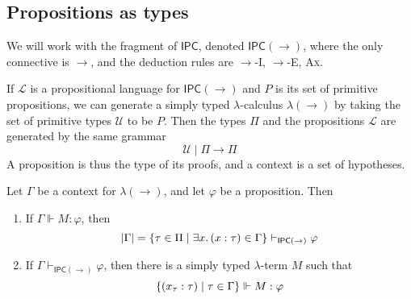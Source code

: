 \subsection{Propositions as types}
We will work with the fragment of \( \mathsf{IPC} \), denoted \( \mathsf{IPC}(\to) \), where the only connective is \( \to \), and the deduction rules are \( \to \)-I, \( \to \)-E, \textsc{Ax}.

If \( \mathcal L \) is a propositional language for \( \mathsf{IPC}(\to) \) and \( P \) is its set of primitive propositions, we can generate a simply typed \( \lambda \)-calculus \( \lambda(\to) \) by taking the set of primitive types \( \mathcal U \) to be \( P \).
Then the types \( \Pi \) and the propositions \( \mathcal L \) are generated by the same grammar
\[ \mathcal U \mid \Pi \to \Pi \]
A proposition is thus the type of its proofs, and a context is a set of hypotheses.
\begin{proposition}
    Let \( \Gamma \) be a context for \( \lambda(\to) \), and let \( \varphi \) be a proposition.
    Then
    \begin{enumerate}
        \item If \( \Gamma \Vdash M : \varphi \), then
        \[ \abs{\Gamma} = \qty{\tau \in \Pi \mid \exists x.\, (x : \tau) \in \Gamma} \vdash_{\mathsf{IPC}(\to)} \varphi \]
        \item If \( \Gamma \vdash_{\mathsf{IPC}(\to)} \varphi \), then there is a simply typed \( \lambda \)-term \( M \) such that
        \[ \qty{(x_\tau : \tau) \mid \tau \in \Gamma} \Vdash M : \varphi \]
    \end{enumerate}
\end{proposition}
